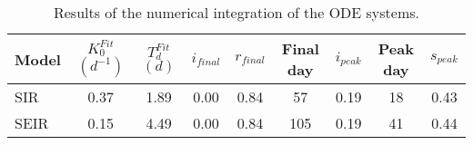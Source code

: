 \begin{table}[h]
\centering
\caption{Results of the numerical integration of the ODE systems.}
\label{tab:models}
\begin{tabular}{lcccccccc}
\toprule
           Model & $K_0^{Fit}$ $(d^{-1})$ & $T_d^{Fit}$ $(d)$ & $i_{final}$ & $r_{final}$ & Final day & $i_{peak}$  & Peak day & $s_{peak}$\\
\midrule
SIR &               0.37 &              1.89 &      0.00 &      0.84 &             57 &      0.19 &              18   &   0.43 \\
SEIR &              0.15 &              4.49 &      0.00 &      0.84 &            105 &      0.19 &              41   &   0.44 \\
\bottomrule
\end{tabular}
\end{table}